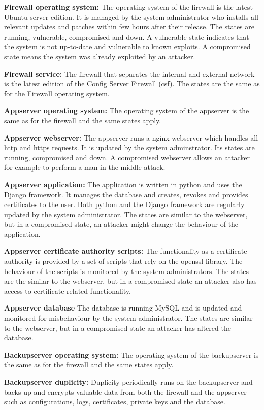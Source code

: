 \documentclass[english]{article}
\begin{document}
	\begin{description}
		\item{\textbf{Firewall operating system:}} The operating system of the firewall is the latest Ubuntu server edition. It is managed by the system administrator who installs all relevant updates and patches within few hours after their release. The states are running, vulnerable, compromised and down. A vulnerable state indicates that the system is not up-to-date and vulnerable to known exploits. A compromised state means the system was already exploited by an attacker.
		\item{\textbf{Firewall service:}} The firewall that separates the internal and external network is the latest edition of the Config Server Firewall (csf). The states are the same as for the Firewall operating system.
		\item{\textbf{Appserver operating system:}} The operating system of the appserver is the same as for the firewall and the same states apply.
		\item{\textbf{Appserver webserver:}} The appserver runs a nginx webserver which handles all http and https requests. It is updated by the system adminstrator. Its states are running, compromised and down. A compromised webserver allows an attacker for example to perform a man-in-the-middle attack.
		\item{\textbf{Appserver application:}} The application is written in python and uses the Django framework. It manages the database and creates, revokes and provides certificates to the user. Both python and the Django framework are regularly updated by the system administrator. The states are similar to the webserver, but in a compromised state, an attacker might change the behaviour of the application.
		\item{\textbf{Appserver certificate authority scripts:}} The functionality as a certificate authority is provided by a set of scripts that rely on the openssl library. The behaviour of the scripts is monitored by the system administrators. The states are the similar to the webserver, but in a compromised state an attacker also has access to certificate related functionality.
		\item{\textbf{Appserver database}} The database is running MySQL and is updated and monitored for misbehaviour by the system administrator. The states are similar to the webserver, but in a compromised state an attacker has altered the database.
		\item{\textbf{Backupserver operating system:}} The operating system of the backupserver is the same as for the firewall and the same states apply.
		\item{\textbf{Backupserver duplicity:}} Duplicity periodically runs on the backupserver and backs up and encrypts valuable data from both the firewall and the appserver such as configurations, logs, certificates, private keys and the database.
	\end{description}
\end{document}
